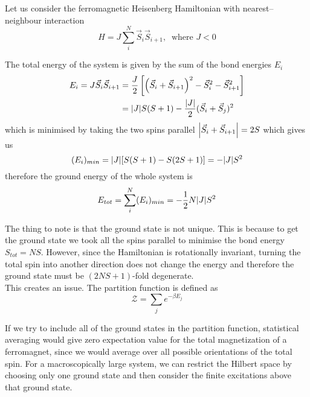 \documentclass[../fstates.tex,../../main.tex]{subfiles}
\begin{document}
Let us consider the ferromagnetic Heisenberg Hamiltonian with nearest--neighbour interaction
\begin{equation}
    H=J\sum_{i}^{N}\vec{S}_{i}\vec{S}_{i+1},\ \text{ where } J<0
\end{equation}

The total energy of the system is given by the sum of the bond energies $E_{i}$
\begin{equation}
\begin{split}
    E_{i}=J\vec{S}_{i}\vec{S}_{i+1}&=\frac{J}{2}\left[ \left(\vec{S}_{i}+\vec{S}_{i+1}\right)^{2}-\vec{S}_{i}^{2}-\vec{S}_{i+1}^{2} \right]\\
        &=\abs{J}S(S+1)-\frac{\abs{J}}{2}(\vec{S}_{i}+\vec{S}_{j})^{2}
\end{split}
\end{equation}
which is minimised by taking the two spins parallel $\abs{\vec{S}_{i}+\vec{S}_{i+1}}=2S$ which gives us
\begin{equation}
    (E_{i})_{min}=\abs{J}[S(S+1)-S(2S+1)]=-\abs{J}S^{2}
\end{equation}
therefore the ground energy of the whole system is
\begin{equation}
    E_{tot}=\sum_{i}^{N} (E_{i})_{min}=-\frac{1}{2}N\abs{J}S^{2}
\end{equation}

The thing to note is that the ground state is not unique. This is because to get the ground state we took all the spins parallel to minimise the bond energy $S_{tot}=NS$. However, since the Hamiltonian is rotationally invariant, turning the total spin into another direction does not change the energy and therefore the ground state must be $(2NS+1)$-fold degenerate.\\

This creates an issue. The partition function is defined as
\begin{equation}
    \mathcal{Z}=\sum_{j}e^{-\beta E_{j}}
\end{equation}

If we try to include all of the ground states in the partition function, statistical averaging would give zero expectation value for the total magnetization of a ferromagnet, since we would average over all possible orientations of the total spin. For a macroscopically large system, we can restrict the Hilbert space by choosing only one ground state and then consider the finite excitations above that ground state.\\
\end{document}
